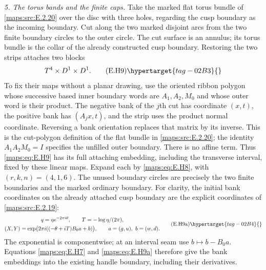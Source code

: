 \begin{theorem}
\emph{5. The torus bands and the finite caps.}
Take the marked flat torus bundle of \ref{maps:src:E.2.20} over the disc with
three holes, regarding the cusp boundary as the incoming boundary.
Cut along the two marked disjoint arcs from the two finite boundary
circles to the outer circle.  The cut surface is an annulus;
its torus bundle is the collar of the already constructed cusp
boundary.  Restoring the two strips attaches two blocks
\[
                 T^4\times D^1\times D^1.
 \tag{E.H9}\hypertarget{tag-02B3}{}\label{maps:eq:E.H9}
\]
To fix their maps without a planar drawing, use the oriented ribbon
polygon whose successive based inner boundary words are
$A_1,A_2,M_0$ and whose outer word is their product.  The negative
bank of the $j$th cut has coordinate $(x,t)$, the positive bank
has $(A_jx,t)$, and the strip uses the product normal coordinate.
Reversing a bank orientation replaces that matrix by its inverse.
This is the cut-polygon definition of the flat bundle in \ref{maps:src:E.2.20};
the identity $A_1A_2M_0=I$ specifies the unfilled outer boundary.
There is no affine term.  Thus \eqref{maps:eq:E.H9} has its full attaching
embedding, including the transverse interval, fixed by these
linear maps.  Expand each by \eqref{maps:eq:E.H8}, with $(r,k,n)=(4,1,6)$.
The unused boundary circles are precisely the two finite boundaries
and the marked ordinary boundary.
For clarity, the initial bank coordinates on the already attached
cusp boundary are the explicit coordinates of \cref{maps:src:E.2.19}:
\[
 \begin{gathered}
 q=\eta e^{-2\pi i\theta},\qquad T=-\log\eta/(2\pi),\\
 (X,Y)=\exp\bigl(2\pi i((-\theta+iT)B_0a+b)\bigr),
 \qquad a=(g,u),\ b=(w,d).
 \end{gathered}
 \tag{E.H9a}\hypertarget{tag-02B4}{}\label{maps:eq:E.H9a}
\]
The exponential is componentwise; at an interval seam use
$b\mapsto b-B_0a$.  Equations \eqref{maps:eq:E.H7} and \eqref{maps:eq:E.H9a} therefore
give the bank embeddings into the existing handle
boundary, including their derivatives.  


\end{theorem}
